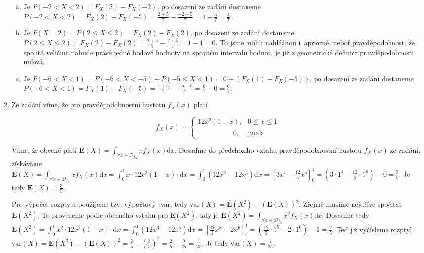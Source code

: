 ﻿\documentclass{article}
\begin{document}
\begin{enumerate}[1)]
\begin{enumerate}[a)]
\item Je $P(-2 < X < 2) = F_{X}(2) - F_{X}(-2)$, po dosazení ze zadání dostaneme $P(-2 < X < 2) = F_{X}(2) - F_{X}(-2) = \frac{2 + 5}{7} - \frac{-2 + 5}{7} = 1 - \frac{3}{7} = \frac{4}{7}$.

\item Je $P(X = 2) = P(2 \leq X \leq 2) = F_{X}(2) - F_{X}(2)$, po dosazení ze zadání dostaneme $P(2 \leq X \leq 2) = F_{X}(2) - F_{X}(2) = \frac{2 + 5}{7} - \frac{2 + 5}{7} = 1 - 1 = 0$. To jsme mohli nahlédnou \mbox{i apriorně}, neboť pravděpodobnost, že spojitá veličina nabude právě jedné bodové hodnoty na spojitém intervalu hodnot, je již z geometrické definice pravděpodobnosti nulová.

\item Je $P(-6 < X < 1) = P(-6 < X < -5) + P(-5 \leq X < 1) = 0 + (F_{X}(1) - F_{X}(-5))$, po dosazení ze zadání dostaneme $P(-6 < X < 1) = F_{X}(1) - F_{X}(-5) = \frac{1 + 5}{7} - \frac{-5 + 5}{7} = \frac{6}{7} - 0 = \frac{6}{7}$.

\end{enumerate}

\item Ze zadání víme, že pro pravděpodobnostní hustotu $f_{X}(x)$ platí

\begin{equation*}
f_{X}(x) = \left\{
\begin{array}{ll}
12x^{2}(1 - x), & 0 \leq x \leq 1 \\
\phantom{12x^{2}(1 \ \ \ \ )}0, & \text{jinak}.
\end{array} \right.
\end{equation*}

Víme, že obecně platí $\mathbf{E}(X) = \int_{\forall x \in \mathcal{D}_{f_{X}}} x f_{X}(x) \text{d}x$. Dosaďme do předchozího vztahu pravděpodobnostní hustotu $f_{X}(x)$ ze zadání, získáváme $\mathbf{E}(X) = \int_{\forall x \in \mathcal{D}_{f_{X}}} x f_{X}(x) \text{d}x = \int_{0}^{1} x \cdot 12x^{2}(1 - x) \cdot \text{d}x = \int_{0}^{1} (12x^{3} - 12x^{4}) \text{d}x = \left[ 3x^{4} - \frac{12}{5}x^{5} \right]_{0}^{1} = (3 \cdot 1^{4} - \frac{12}{5} \cdot 1^{5}) - 0 = \frac{3}{5}$. Je tedy $\mathbf{E}(X) =  \frac{3}{5}$.

Pro výpočet rozptylu použijeme tzv. výpočtový tvar, tedy $\mathrm{var}(X) = \mathbf{E}(X^{2}) - (\mathbf{E}(X))^{2}$. Zřejmě musíme nejdříve spočítat $\mathbf{E}(X^{2})$. To provedeme podle obecného vztahu pro $\mathbf{E}(X^{2})$, kdy je $\mathbf{E}(X^{2}) = \int_{\forall x \in \mathcal{D}_{f_{X}}} x^{2} f_{X}(x) \text{d}x$. Dosaďme tedy $\mathbf{E}(X^{2}) = \int_{0}^{1} x^{2} \cdot 12x^{2}(1 - x) \cdot \text{d}x = \int_{0}^{1} (12x^{4} - 12x^{5}) \text{d}x = \left[ \frac{12}{5}x^{5} - 2x^{6} \right]_{0}^{1} = (\frac{12}{5} \cdot 1^{5} - 2 \cdot 1^{6}) - 0 = \frac{2}{5}$. Teď již vyčísleme rozptyl $\mathrm{var}(X) = \mathbf{E}(X^{2}) - (\mathbf{E}(X))^{2} = \frac{2}{5} - \left( \frac{3}{5} \right)^{2} = \frac{2}{5} - \frac{9}{25} = \frac{1}{25}$. Je tedy $\mathrm{var}(X) = \frac{1}{25}$.


\end{enumerate}
\end{document}
